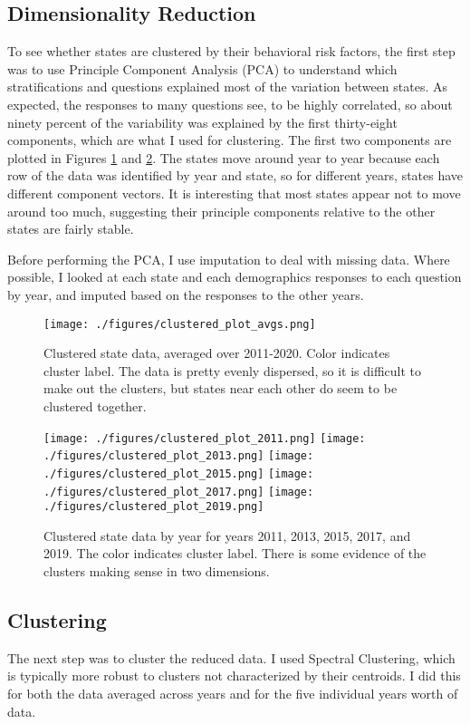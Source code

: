 \documentclass[11pt]{article}
\begin{document}
\subsection{Dimensionality Reduction}
To see whether states are clustered by their behavioral risk factors, the first step was to use Principle Component Analysis (PCA) to understand which stratifications and questions explained most of the variation between states. As expected, the responses to many questions see, to be highly correlated, so about ninety percent of the variability was explained by the first thirty-eight components, which are what I used for clustering. The first two components are plotted in Figures \ref{fig:clustered_avgs} and \ref{fig:clustered_data}. The states move around year to year because each row of the data was identified by year and state, so for different years, states have different component vectors. It is interesting that most states appear not to move around too much, suggesting their principle components relative to the other states are fairly stable.

Before performing the PCA, I use imputation to deal with missing data. Where possible, I looked at each state and each demographics responses to each question by year, and imputed based on the responses to the other years.

\begin{figure}[htbp]
\centering
\texttt{[image: ./figures/clustered\_plot\_avgs.png]}
\caption{\label{fig:clustered_avgs}
  Clustered state data, averaged over 2011-2020. Color indicates cluster label. The data is pretty evenly dispersed, so it is difficult to make out the clusters, but states near each other do seem to be clustered together.
}
\end{figure}

\begin{figure}[hp]
\texttt{[image: ./figures/clustered\_plot\_2011.png]}
\texttt{[image: ./figures/clustered\_plot\_2013.png]}
\texttt{[image: ./figures/clustered\_plot\_2015.png]}
\texttt{[image: ./figures/clustered\_plot\_2017.png]}
\texttt{[image: ./figures/clustered\_plot\_2019.png]}
\caption{\label{fig:clustered_data}
  Clustered state data by year for years 2011, 2013, 2015, 2017, and 2019. The color indicates cluster label. There is some evidence of the clusters making sense in two dimensions.
}
\end{figure}

\subsection{Clustering}
The next step was to cluster the reduced data. I used Spectral Clustering, which is typically more robust to clusters not characterized by their centroids. I did this for both the data averaged across years and for the five individual years worth of data. 
\end{document}
